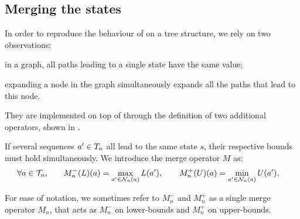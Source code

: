 \documentclass[runningheads]{llncs}
\begin{document}
\subsection{Merging the states}

In order to reproduce the behaviour of  on a tree structure, we rely on two observations: \begin{enumerate*}[label=(\roman*)]
	\item in a graph, all paths leading to a single state have the same value;
	\item expanding a node in the graph simultaneously expands all the paths that lead to this node.
\end{enumerate*}
They are implemented on top of  through the definition of two additional operators, shown in .


\begin{definition}
If several sequences $a'\in T_n$ all lead to the same state $s$, their respective bounds must hold simultaneously. We introduce the merge operator $M$ as:
    \begin{align}
    \label{eq:merge}
        \forall a\in\mathcal{T}_n, \qquad &M_n^-(L)(a) = \max_{a'\in \mathcal{N}_n(a)} L(a'),\qquad M_n^+(U)(a) = \min_{a'\in \mathcal{N}_n(a)} U(a').                                   
    \end{align}
\end{definition}

\begin{remark} For ease of notation, we sometimes refer to $M_n^-$ and $M_n^+$ as a single merge operator $M_n$, that acts as $M_n^-$ on lower-bounds and $M_n^+$ on upper-bounds.
\end{remark}
\end{document}

